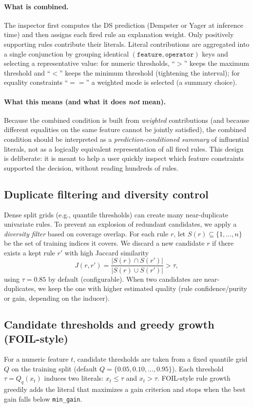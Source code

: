 \documentclass[11pt,a4paper]{article}
\providecommand{\1}{}
\renewcommand{\1}{\mathbbm{1}}
\begin{document}
\paragraph{What is combined.}
The inspector first computes the DS prediction (Dempster or Yager at inference time) and then assigns each fired rule an explanation weight.
Only positively supporting rules contribute their literals. Literal contributions are aggregated into a single conjunction by grouping identical $(\texttt{feature},\texttt{operator})$ keys and selecting a representative value:
for numeric thresholds, ``$>$'' keeps the maximum threshold and ``$<$'' keeps the minimum threshold (tightening the interval);
for equality constraints ``$==$'' a weighted mode is selected (a summary choice).

\paragraph{What this means (and what it does \emph{not} mean).}
Because the combined condition is built from \emph{weighted} contributions (and because different equalities on the same feature cannot be jointly satisfied),
the combined condition should be interpreted as a \emph{prediction-conditioned summary} of influential literals, not as a logically equivalent representation of all fired rules.
This design is deliberate: it is meant to help a user quickly inspect which feature constraints supported the decision, without reading hundreds of rules.

\subsection{Duplicate filtering and diversity control}
Dense split grids (e.g., quantile thresholds) can create many near-duplicate univariate rules.
To prevent an explosion of redundant candidates, we apply a \emph{diversity filter} based on coverage overlap.
For each rule $r$, let $S(r)\subseteq\{1,\dots,n\}$ be the set of training indices it covers.
We discard a new candidate $r$ if there exists a kept rule $r'$ with high Jaccard similarity
\[
J(r,r')=\frac{|S(r)\cap S(r')|}{|S(r)\cup S(r')|}>\tau,
\]
using $\tau=0.85$ by default (configurable).
When two candidates are near-duplicates, we keep the one with higher estimated quality (rule confidence/purity or gain, depending on the inducer).

\subsection{Candidate thresholds and greedy growth (FOIL-style)}
For a numeric feature $t$, candidate thresholds are taken from a fixed quantile grid $Q$ on the training split
(default $Q=\{0.05,0.10,\dots,0.95\}$). Each threshold $\tau=Q_q(x_t)$ induces two literals: $x_t\le\tau$ and $x_t>\tau$.
FOIL-style rule growth greedily adds the literal that maximizes a gain criterion \cite{Quinlan1990} and stops when the best gain falls below \texttt{min\_gain}.
\end{document}
